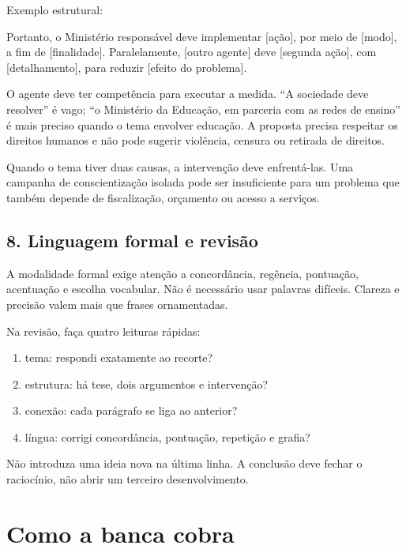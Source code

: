 \documentclass[11pt,a4paper]{article}
\begin{document}
Exemplo estrutural:

\begin{alerta}
Portanto, o Ministério responsável deve implementar [ação], por meio de [modo], a fim de [finalidade]. Paralelamente, [outro agente] deve [segunda ação], com [detalhamento], para reduzir [efeito do problema].
\end{alerta}

O agente deve ter competência para executar a medida. “A sociedade deve resolver” é vago; “o Ministério da Educação, em parceria com as redes de ensino” é mais preciso quando o tema envolver educação. A proposta precisa respeitar os direitos humanos e não pode sugerir violência, censura ou retirada de direitos.

Quando o tema tiver duas causas, a intervenção deve enfrentá-las. Uma campanha de conscientização isolada pode ser insuficiente para um problema que também depende de fiscalização, orçamento ou acesso a serviços.

\subsection*{8. Linguagem formal e revisão}

A modalidade formal exige atenção a concordância, regência, pontuação, acentuação e escolha vocabular. Não é necessário usar palavras difíceis. Clareza e precisão valem mais que frases ornamentadas.

Na revisão, faça quatro leituras rápidas:

\begin{enumerate}
  \item tema: respondi exatamente ao recorte?
  \item estrutura: há tese, dois argumentos e intervenção?
  \item conexão: cada parágrafo se liga ao anterior?
  \item língua: corrigi concordância, pontuação, repetição e grafia?
\end{enumerate}

Não introduza uma ideia nova na última linha. A conclusão deve fechar o raciocínio, não abrir um terceiro desenvolvimento.

\section*{Como a banca cobra}
\end{document}
